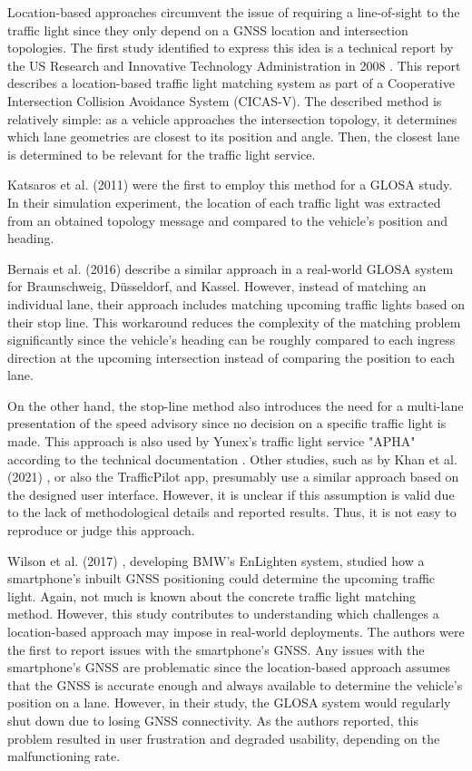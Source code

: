 Location-based approaches circumvent the issue of requiring a line-of-sight to the traffic light since they only depend on a GNSS location and intersection topologies. The first study identified to express this idea is a technical report by the US Research and Innovative Technology Administration in 2008 \cite{cicas-v}. This report describes a location-based traffic light matching system as part of a Cooperative Intersection Collision Avoidance System (CICAS-V). The described method is relatively simple: as a vehicle approaches the intersection topology, it determines which lane geometries are closest to its position and angle. Then, the closest lane is determined to be relevant for the traffic light service.

Katsaros et al. (2011) \cite{katsaros_performance_2011} were the first to employ this method for a GLOSA study. In their simulation experiment, the location of each traffic light was extracted from an obtained topology message and compared to the vehicle's position and heading.

Bernais et al. (2016) \cite{bernais_design_2016} describe a similar approach in a real-world GLOSA system for Braunschweig, Düsseldorf, and Kassel. However, instead of matching an individual lane, their approach includes matching upcoming traffic lights based on their stop line. This workaround reduces the complexity of the matching problem significantly since the vehicle's heading can be roughly compared to each ingress direction at the upcoming intersection instead of comparing the position to each lane. 

On the other hand, the stop-line method also introduces the need for a multi-lane presentation of the speed advisory since no decision on a specific traffic light is made. This approach is also used by Yunex's traffic light service "APHA" according to the technical documentation \cite{yunex_traffic_v2x-kommunikation_2023}. Other studies, such as by Khan et al. (2021) \cite{khan_eco-drive_2021}, or also the TrafficPilot app, presumably use a similar approach based on the designed user interface. However, it is unclear if this assumption is valid due to the lack of methodological details and reported results. Thus, it is not easy to reproduce or judge this approach.

Wilson et al. (2017) \cite{wilson_driver_2017}, developing BMW's EnLighten system, studied how a smartphone's inbuilt GNSS positioning could determine the upcoming traffic light. Again, not much is known about the concrete traffic light matching method. However, this study contributes to understanding which challenges a location-based approach may impose in real-world deployments. The authors were the first to report issues with the smartphone's GNSS. Any issues with the smartphone's GNSS are problematic since the location-based approach assumes that the GNSS is accurate enough and always available to determine the vehicle's position on a lane. However, in their study, the GLOSA system would regularly shut down due to losing GNSS connectivity. As the authors reported, this problem resulted in user frustration and degraded usability, depending on the malfunctioning rate.

